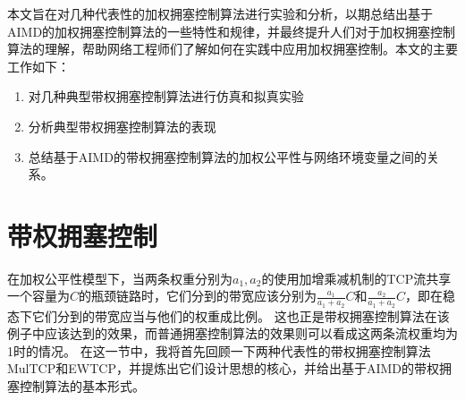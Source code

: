 \documentclass[winfonts]{njuthesis}
\begin{document}
本文旨在对几种代表性的加权拥塞控制算法进行实验和分析，以期总结出基于AIMD的加权拥塞控制算法的一些特性和规律，并最终提升人们对于加权拥塞控制算法的理解，帮助网络工程师们了解如何在实践中应用加权拥塞控制。本文的主要工作如下：
\begin{enumerate}
\item 对几种典型带权拥塞控制算法进行仿真和拟真实验

\item 分析典型带权拥塞控制算法的表现

\item 总结基于AIMD的带权拥塞控制算法的加权公平性与网络环境变量之间的关系。
\end{enumerate}



\chapter{带权拥塞控制}\label{chapter:wcc}

在加权公平性模型下，当两条权重分别为$a_1, a_2$的使用加增乘减机制的TCP流共享一个容量为$C$的瓶颈链路时，它们分到的带宽应该分别为$\frac{a_1}{a_1 + a_2}C$和$\frac{a_2}{a_1 + a_2}C$，即在稳态下它们分到的带宽应当与他们的权重成比例。
这也正是带权拥塞控制算法在该例子中应该达到的效果，而普通拥塞控制算法的效果则可以看成这两条流权重均为1时的情况。
在这一节中，我将首先回顾一下两种代表性的带权拥塞控制算法MulTCP\cite{crowcroft1998differentiated}和EWTCP\cite{wischik2011design}，并提炼出它们设计思想的核心，并给出基于AIMD的带权拥塞控制算法的基本形式。
\end{document}
